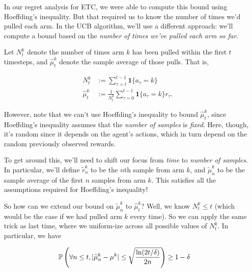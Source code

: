 \documentclass[../main/main]{subfiles}
\begin{document}
In our regret analysis for ETC, we were able to compute this bound using Hoeffding's inequality. But that required us to know the number of times we'd pulled each arm. In the UCB algorithm, we'll use a different approach: we'll compute a bound based on the \emph{number of times we've pulled each arm so far}.

Let $N^k_t$ denote the number of times arm $k$ has been pulled within the first $t$ timesteps, and $\hat \mu^k_t$ denote the sample average of those pulls. That is,

\begin{align*}
    N^k_t &:= \sum_{\tau=t}^{t-1} \mathbf{1} \{ a_\tau = k \} \\
    \hat \mu^k_t &:= \frac{1}{N^k_t} \sum_{\tau=0}^{t-1} \mathbf{1} \{ a_\tau = k \} r_\tau.
\end{align*}

However, note that we can't use Hoeffding's inequality to bound $\hat \mu^k_t$, since Hoeffding's inequality assumes that the \emph{number of samples} is \emph{fixed}. Here, though, it's random since it depends on the agent's actions, which in turn depend on the random previously observed rewards.

To get around this, we'll need to shift our focus from \emph{time} to \emph{number of samples}. In particular, we'll define $\tilde r^k_n$ to be the $n$th sample from arm $k$, and $\tilde \mu^k_n$ to be the sample average of the first $n$ samples from arm $k$. This satisfies all the assumptions required for Hoeffding's inequality!

So how can we extend our bound on $\tilde\mu^k_n$ to $\hat \mu^k_t$? Well, we know $N^k_t \le t$ (which would be the case if we had pulled arm $k$ every time). So we can apply the same trick as last time, where we uniform-ize across all possible values of $N^k_t$. In particular, we have

\begin{align*}
    \P\left( \forall n \le t, |\tilde \mu^k_n - \mu^k | \le \sqrt{\frac{\ln(2t/\delta)}{2n}} \right) &\ge 1-\delta
\end{align*}
\end{document}
